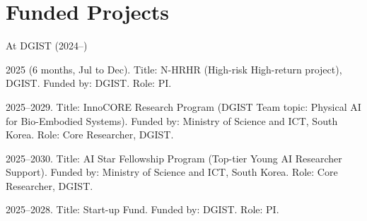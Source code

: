 \section{Funded Projects}

\vspace{1mm}
\begin{pubSubsectionNum}{At DGIST (2024--)}
    \item 2025 (6 months, Jul to Dec). Title: N-HRHR (High-risk High-return project), DGIST. Funded by: DGIST. Role: PI.
    \vspace{-1mm}
    \item 2025--2029. Title: InnoCORE Research Program (DGIST Team topic: Physical AI for Bio-Embodied Systems). Funded by: Ministry of Science and ICT, South Korea. Role: Core Researcher, DGIST.
    \vspace{-1mm}
    \item 2025--2030. Title: AI Star Fellowship Program (Top-tier Young AI Researcher Support). Funded by: Ministry of Science and ICT, South Korea. Role: Core Researcher, DGIST.
    \vspace{-1mm}
    \item 2025--2028. Title: Start-up Fund. Funded by: DGIST. Role: PI.
    \vspace{-1mm}
\end{pubSubsectionNum}

